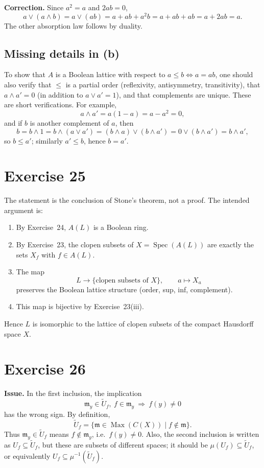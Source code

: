 \documentclass[11pt]{article}
\DeclareMathOperator{\Spec}{Spec}
\DeclareMathOperator{\Max}{Max}
\newcommand{\fm}{\mathfrak m}
\begin{document}
\textbf{Correction.}  Since \(a^2=a\) and \(2ab=0\),
\[
a\vee(a\wedge b)
=a\vee(ab)
=a+ab+a^2b
=a+ab+ab
=a+2ab
=a.
\]
The other absorption law follows by duality.

\subsection*{Missing details in (b)}
To show that \(A\) is a Boolean lattice with respect to \(a\le b\iff a=ab\),
one should also verify that \(\le\) is a partial order (reflexivity,
antisymmetry, transitivity), that \(a\wedge a'=0\) (in addition to
\(a\vee a'=1\)), and that complements are unique.  These are short
verifications.  For example,
\[
a\wedge a'=a(1-a)=a-a^2=0,
\]
and if \(b\) is another complement of \(a\), then
\[
b=b\wedge1=b\wedge(a\vee a')=(b\wedge a)\vee(b\wedge a')
=0\vee(b\wedge a')=b\wedge a',
\]
so \(b\le a'\); similarly \(a'\le b\), hence \(b=a'\).

\section*{Exercise 25}

The statement is the conclusion of Stone's theorem, not a proof.  The
intended argument is:

\begin{enumerate}[label=(\roman*)]
  \item By Exercise~24, \(A(L)\) is a Boolean ring.
  \item By Exercise~23, the clopen subsets of \(X=\Spec(A(L))\) are exactly
        the sets \(X_f\) with \(f\in A(L)\).
  \item The map
        \[
        L\longrightarrow\{\text{clopen subsets of }X\},\qquad
        a\longmapsto X_a
        \]
        preserves the Boolean lattice structure (order, sup, inf,
        complement).
  \item This map is bijective by Exercise~23(iii).
\end{enumerate}
Hence \(L\) is isomorphic to the lattice of clopen subsets of the compact
Hausdorff space \(X\).

\section*{Exercise 26}

\textbf{Issue.}  In the first inclusion, the implication
\[
\fm_y\in\widetilde U_f,\ f\in\fm_y\ \Longrightarrow\ f(y)\neq0
\]
has the wrong sign.  By definition,
\[
\widetilde U_f=\{\fm\in\Max(C(X))\mid f\notin\fm\}.
\]
Thus \(\fm_y\in\widetilde U_f\) means \(f\notin\fm_y\), i.e.\ \(f(y)\neq0\).
Also, the second inclusion is written as \(U_f\subseteq\widetilde U_f\), but
these are subsets of different spaces; it should be
\(\mu(U_f)\subseteq\widetilde U_f\), or equivalently
\(U_f\subseteq\mu^{-1}(\widetilde U_f)\).
\end{document}
